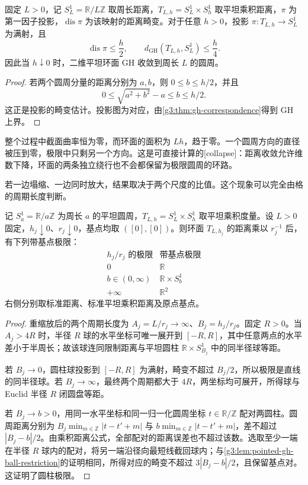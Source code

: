 \begin{proposition}\label{g3:prop:flat-torus-collapse}
	固定 \(L>0\)，记 \(S^1_L=\mathbb R/L\mathbb Z\) 取周长距离，\(T_{L,h}=S^1_L\times S^1_h\) 取平坦乘积距离，\(\pi\) 为第一因子投影，\(\operatorname{dis}\pi\) 为该映射的距离畸变。对于任意 \(h>0\)，投影 \(\pi:T_{L,h}\to S^1_L\) 为满射，且
	\[
		\operatorname{dis}\pi\le\frac h2,
		\qquad d_{\mathrm{GH}}(T_{L,h},S^1_L)\le\frac h4.
	\]
	因此当 \(h\downarrow0\) 时，二维平坦环面 GH 收敛到周长 \(L\) 的圆周。
\end{proposition}
\begin{proof}
	若两个圆周分量的距离分别为 \(a,b\)，则 \(0\le b\le h/2\)，并且
	\[
		0\le\sqrt{a^2+b^2}-a\le b\le h/2.
	\]
	这正是投影的畸变估计。投影图为对应，由\cref{g3:thm:gh-correspondence}得到 GH 上界。
\end{proof}

整个过程中截面曲率恒为零，而环面的面积为 \(Lh\)，趋于零。一个圆周方向的直径被压到零，极限中只剩另一个方向。这是可直接计算的[collapse]：距离收敛允许维数下降，环面的两条独立绕行也不会都保留为极限圆周的环路。

\ProseParagraphBreak

若一边塌缩、一边同时放大，结果取决于两个尺度的比值。这个现象可以完全由格的周期长度判断。

\begin{proposition}\label{g3:prop:torus-collapse-rescale}
	记 \(S^1_a=\mathbb R/a\mathbb Z\) 为周长 \(a\) 的平坦圆周，\(T_{L,h}=S^1_L\times S^1_h\) 取平坦乘积度量。设 \(L>0\) 固定，\(h_j\downarrow0\)、\(r_j\downarrow0\)，基点均取 \(([0],[0])\)。则环面 \(T_{L,h_j}\) 的距离乘以 \(r_j^{-1}\) 后，有下列带基点极限：
	\[
	\begin{array}{c|c}
	 h_j/r_j\text{ 的极限}&\text{带基点极限}\\ \hline
	 0&\mathbb R\\
	 b\in(0,\infty)&\mathbb R\times S^1_b\\
	 +\infty&\mathbb R^2
	\end{array}
	\]
	右侧分别取标准距离、标准平坦乘积距离及原点基点。
\end{proposition}
\begin{proof}
	重缩放后的两个周期长度为
	\(A_j=L/r_j\to\infty\)、\(B_j=h_j/r_j\)。固定 \(R>0\)。当 \(A_j>4R\) 时，半径 \(R\) 球的水平坐标可唯一展开到 \([-R,R]\)，其中任意两点的水平差小于半周长；故该球连同限制距离与平坦圆柱 \(\mathbb R\times S^1_{B_j}\) 中的同半径球等距。

	若 \(B_j\to0\)，圆柱球投影到 \([-R,R]\) 为满射，畸变不超过 \(B_j/2\)，所以极限是直线的同半径球。若 \(B_j\to\infty\)，最终两个周期都大于 \(4R\)，两坐标均可展开，所得球与 Euclid 半径 \(R\) 闭圆盘等距。

	若 \(B_j\to b>0\)，用同一水平坐标和同一归一化圆周坐标 \(t\in\mathbb R/\mathbb Z\) 配对两圆柱。圆周距离分别为 \(B_j\min_{m\in\mathbb Z}|t-t'+m|\) 与 \(b\min_{m\in\mathbb Z}|t-t'+m|\)，差不超过 \(|B_j-b|/2\)。由乘积距离公式，全部配对的距离误差也不超过该数。选取至少一端在半径 \(R\) 球内的配对，将另一端沿径向最短线截回球内；与\cref{g3:lem:pointed-gh-ball-restriction}的证明相同，所得对应的畸变不超过 \(3|B_j-b|/2\)，且保留基点对。这证明了圆柱极限。
\end{proof}

